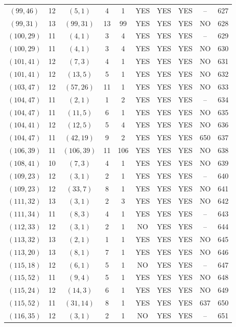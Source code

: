 \begin{longtable}{|c|c|c|c|c|c|c|c|c|c|}
$(99, 46)$ & 12 & $(5, 1)$ & 4 & 1 & YES & YES & YES & -- & 627\\
$(99, 31)$ & 13 & $(99, 31)$ & 13 & 99 & YES & YES & YES & NO & 628\\
$(100, 29)$ & 11 & $(4, 1)$ & 3 & 4 & YES & YES & YES & -- & 629\\
$(100, 29)$ & 11 & $(4, 1)$ & 3 & 4 & YES & YES & YES & NO & 630\\
$(101, 41)$ & 12 & $(7, 3)$ & 4 & 1 & YES & YES & YES & NO & 631\\
$(101, 41)$ & 12 & $(13, 5)$ & 5 & 1 & YES & YES & YES & NO & 632\\
$(103, 47)$ & 12 & $(57, 26)$ & 11 & 1 & YES & YES & YES & NO & 633\\
$(104, 47)$ & 11 & $(2, 1)$ & 1 & 2 & YES & YES & YES & -- & 634\\
$(104, 47)$ & 11 & $(11, 5)$ & 6 & 1 & YES & YES & YES & NO & 635\\
$(104, 41)$ & 12 & $(12, 5)$ & 5 & 4 & YES & YES & YES & NO & 636\\
$(104, 47)$ & 11 & $(42, 19)$ & 9 & 2 & YES & YES & YES & 650 & 637\\
$(106, 39)$ & 11 & $(106, 39)$ & 11 & 106 & YES & YES & YES & NO & 638\\
$(108, 41)$ & 10 & $(7, 3)$ & 4 & 1 & YES & YES & YES & NO & 639\\
$(109, 23)$ & 12 & $(3, 1)$ & 2 & 1 & YES & YES & YES & -- & 640\\
$(109, 23)$ & 12 & $(33, 7)$ & 8 & 1 & YES & YES & YES & NO & 641\\
$(111, 32)$ & 13 & $(3, 1)$ & 2 & 3 & YES & YES & YES & NO & 642\\
$(111, 34)$ & 11 & $(8, 3)$ & 4 & 1 & YES & YES & YES & -- & 643\\
$(112, 33)$ & 12 & $(3, 1)$ & 2 & 1 & NO & YES & YES & -- & 644\\
$(113, 32)$ & 13 & $(2, 1)$ & 1 & 1 & YES & YES & YES & NO & 645\\
$(113, 20)$ & 13 & $(8, 1)$ & 7 & 1 & YES & YES & YES & NO & 646\\
$(115, 18)$ & 12 & $(6, 1)$ & 5 & 1 & NO & YES & YES & -- & 647\\
$(115, 52)$ & 11 & $(9, 4)$ & 5 & 1 & YES & YES & YES & NO & 648\\
$(115, 24)$ & 12 & $(14, 3)$ & 6 & 1 & YES & YES & YES & NO & 649\\
$(115, 52)$ & 11 & $(31, 14)$ & 8 & 1 & YES & YES & YES & 637 & 650\\
$(116, 35)$ & 12 & $(3, 1)$ & 2 & 1 & NO & YES & YES & -- & 651\\

\end{longtable}
